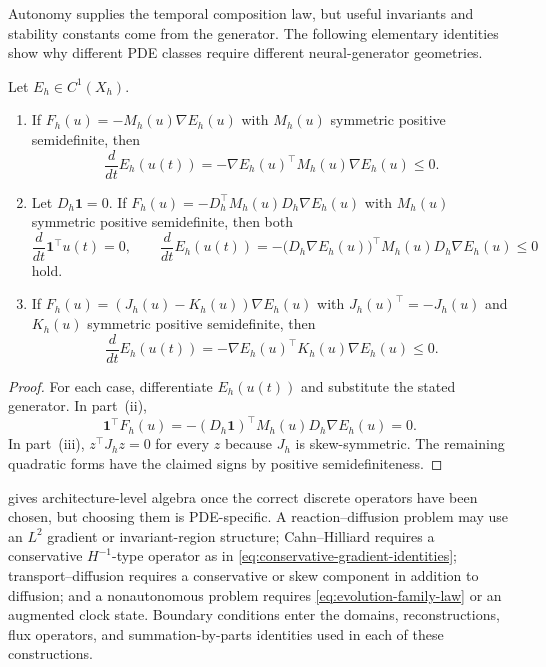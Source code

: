 Autonomy supplies the temporal composition law, but useful invariants and stability constants come from the generator.  The following elementary identities show why different PDE classes require different neural-generator geometries.

\begin{proposition}\label{prop:pde-generator-geometries}
Let $E_h\in C^1(X_h)$.
\begin{enumerate}[label=(\roman*)]
    \item If $F_h(u)=-M_h(u)\nabla E_h(u)$ with $M_h(u)$ symmetric positive semidefinite, then
    \begin{equation}\label{eq:l2-gradient-dissipation}
    \frac{d}{dt}E_h(u(t))=-\nabla E_h(u)^\top M_h(u)\nabla E_h(u)\leq0.
    \end{equation}
    \item Let $D_h\mathbf{1}=0$.  If $F_h(u)=-D_h^\top M_h(u)D_h\nabla E_h(u)$ with $M_h(u)$ symmetric positive semidefinite, then both
    \begin{equation}\label{eq:conservative-gradient-identities}
    \frac{d}{dt}\mathbf{1}^\top u(t)=0,\qquad \frac{d}{dt}E_h(u(t))=-\bigl(D_h\nabla E_h(u)\bigr)^\top M_h(u)D_h\nabla E_h(u)\leq0
    \end{equation}
    hold.
    \item If $F_h(u)=(J_h(u)-K_h(u))\nabla E_h(u)$ with $J_h(u)^\top=-J_h(u)$ and $K_h(u)$ symmetric positive semidefinite, then
    \begin{equation}\label{eq:skew-dissipative-identity}
    \frac{d}{dt}E_h(u(t))=-\nabla E_h(u)^\top K_h(u)\nabla E_h(u)\leq0.
    \end{equation}
\end{enumerate}
\end{proposition}

\begin{proof}
For each case, differentiate $E_h(u(t))$ and substitute the stated generator.  In part~(ii),
\begin{equation*}
\mathbf{1}^\top F_h(u)=-(D_h\mathbf{1})^\top M_h(u)D_h\nabla E_h(u)=0.
\end{equation*}
In part~(iii), $z^\top J_hz=0$ for every $z$ because $J_h$ is skew-symmetric.  The remaining quadratic forms have the claimed signs by positive semidefiniteness.
\end{proof}

 gives architecture-level algebra once the correct discrete operators have been chosen, but choosing them is PDE-specific.  A reaction--diffusion problem may use an $L^2$ gradient or invariant-region structure; Cahn--Hilliard requires a conservative $H^{-1}$-type operator as in \eqref{eq:conservative-gradient-identities}; transport--diffusion requires a conservative or skew component in addition to diffusion; and a nonautonomous problem requires \eqref{eq:evolution-family-law} or an augmented clock state.  Boundary conditions enter the domains, reconstructions, flux operators, and summation-by-parts identities used in each of these constructions.

